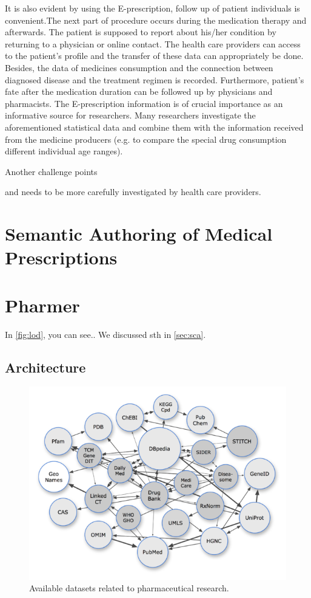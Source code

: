 \documentclass[10pt, conference, compsocconf]{IEEEtran}
\begin{document}
It is also evident by using the E-prescription, follow up of patient individuals is convenient.The next part of procedure occurs during the medication therapy and afterwards. The patient is supposed to report about his/her condition by returning to a physician or online contact.
The health care providers can access to the patient's profile and the transfer of these data can appropriately be done.
Besides, the data of medicines consumption and the connection between diagnosed disease and the treatment regimen is recorded.
Furthermore, patient's fate after the medication duration can be followed up by physicians and pharmacists.
The E-prescription information is  of crucial importance as an  informative source for researchers.
Many researchers investigate the aforementioned statistical data and combine them with the information received from the medicine producers (e.g. to compare the special drug consumption different  individual age ranges).


Another challenge points

 and needs to be more carefully investigated by health care providers.



\section{Semantic Authoring of Medical Prescriptions}
\label{scamp}

\section{Pharmer}
\label{pharmer}
In \autoref{fig:lod}, you can see..
We discussed sth in \autoref{sec:sca}.

\subsection{Architecture}

\begin{figure}[tb]
	\centering
		\includegraphics[width=1.0\columnwidth]{images/lod_cloud.png}
	\caption{Available datasets related to pharmaceutical research.}
	\label{fig:lod}
\end{figure}
\end{document}
